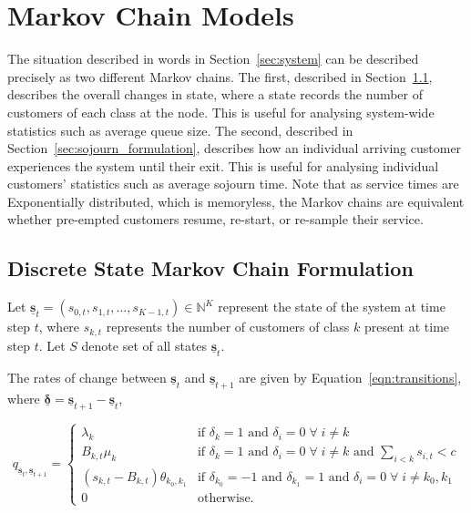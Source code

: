 \documentclass{article}
\begin{document}
\section{Markov Chain Models}\label{sec:makovchains}
The situation described in words in Section~\ref{sec:system} can be described
precisely as two different Markov chains.
The first, described in Section~\ref{sec:state_formulation}, describes the
overall changes in state, where a state records the number of customers of each
class at the node. This is useful for analysing system-wide statistics such as
average queue size.
The second, described in Section~\ref{sec:sojourn_formulation}, describes how an
individual arriving customer experiences the system until their exit. This is
useful for analysing individual customers' statistics such as average sojourn
time.
Note that as service times are Exponentially distributed, which is memoryless,
the Markov chains are equivalent whether pre-empted customers resume, re-start,
or re-sample their service.


\subsection{Discrete State Markov Chain Formulation}\label{sec:state_formulation}
Let
$\underline{\mathbf{s}}_t = (s_{0,t}, s_{1,t}, \dots, s_{K-1,t}) \in \mathbb{N}^K$
represent the state of the system at time step $t$, where $s_{k,t}$ represents
the number of customers of class $k$ present at time step $t$. Let $S$ denote
set of all states $\underline{\mathbf{s}}_t$. 

The rates of change between $\underline{\mathbf{s}}_t$ and
$\underline{\mathbf{s}}_{t+1}$ are given by Equation~\ref{eqn:transitions},
where $\underline{\mathbf{\delta}} = \underline{\mathbf{s}}_{t+1} - \underline{\mathbf{s}}_t$,

\begin{equation}\label{eqn:transitions}
q_{\underline{\mathbf{s}}_t, \underline{\mathbf{s}}_{t+1}} = 
\begin{cases}
\lambda_k & \text{if } \delta_k = 1 \text{ and } \delta_i = 0 \; \forall \; i \neq k \\
B_{k,t} \mu_k & \text{if } \delta_k = 1 \text{ and } \delta_i = 0 \; \forall \; i \neq k \text{ and } \sum_{i < k} s_{i,t} < c \\
(s_{k,t} - B_{k,t}) \theta_{k_0,k_1} & \text{if } \delta_{k_0} = -1 \text{ and } \delta_{k_1} = 1 \text{ and } \delta_i = 0 \; \forall \; i \neq k_0, k_1 \\
0 & \text{otherwise.}
\end{cases}
\end{equation}
\end{document}
